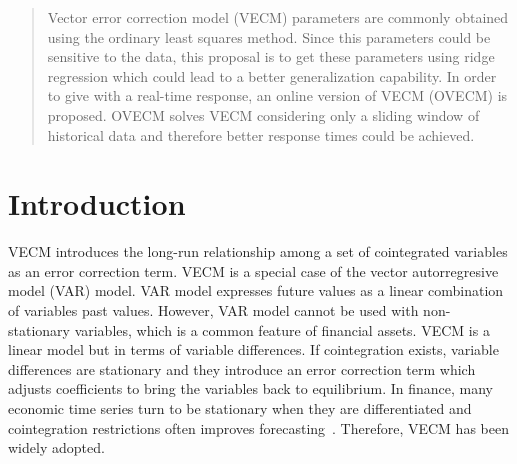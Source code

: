 \documentclass[twocolumn]{svjour3}          %
\begin{document}
\begin{abstract}

%
%
Vector error correction model (VECM) parameters are commonly obtained using the
ordinary least squares method. Since this parameters could be sensitive to the
data, this proposal is to get these parameters using ridge regression which
could lead to a better generalization capability. In order to give with a
real-time response, an online version of VECM (OVECM) is proposed. OVECM solves
VECM considering only a sliding window of historical data and therefore
better response times could be achieved.



\end{abstract}

\section{Introduction}
\label{sec:introduction}
VECM introduces the long-run relationship among a set of cointegrated variables
as an error correction term. VECM is a special case of the vector autorregresive
model (VAR) model. VAR model expresses future values as a linear combination of
variables past values.  However, VAR model cannot be used with non-stationary
variables, which is a common feature of financial assets. VECM is a linear model
but in terms of variable differences. If cointegration exists, variable
differences are stationary and they introduce an error correction term which
adjusts coefficients to bring the variables back to equilibrium. In finance,
many economic time series turn to be stationary when they are differentiated and
cointegration restrictions often improves forecasting~\cite{duy1998}. Therefore,
VECM has been widely adopted.
\end{document}
